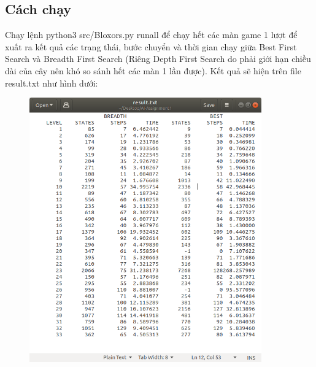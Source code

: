 \documentclass[11pt,a4paper]{article}
\begin{document}
\subsection{Cách chạy}
\begin{description}
	\item \hspace{1 cm}	Chạy lệnh python3 src/Bloxors.py runall để chạy hết các màn game 1 lượt để xuất ra kết quả các trạng thái, bước chuyển và thời gian chạy giữa Best First Search và Breadth First Search (Riêng Depth First Search do phải giới hạn chiều dài của cây nên khó so sánh hết các màn 1 lần được). Kết quả sẽ hiện trên file result.txt như hình dưới:
\end{description}
\newpage
\begin{center}
	\begin{figure}[htp]
		\begin{center}
			\includegraphics[width=10cm]{Images/ssBFS_va_BRFS.png}
		\end{center}
		\caption{\label{fig:ssBFS_va_BRFS}}
	\end{figure}
\end{center}
\end{document}
